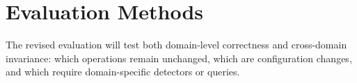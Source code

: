 \section{Evaluation Methods}

The revised evaluation will test both domain-level correctness and cross-domain invariance: which operations remain unchanged, which are configuration changes, and which require domain-specific detectors or queries.

